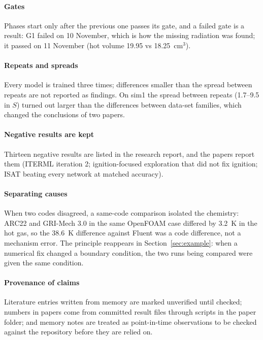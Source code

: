 \documentclass[preprint,review,12pt]{elsarticle}
\begin{document}
\paragraph{Gates} Phases start only after the previous one passes its gate, and a failed gate is a result: G1 failed on
10 November, which is how the missing radiation was found; it passed on 11 November (hot volume 19.95 vs 18.25~cm$^3$).

\paragraph{Repeats and spreads} Every model is trained three times; differences smaller than the spread between
repeats are not reported as findings. On sim1 the spread between repeats (1.7--9.5 in $S$) turned out larger than the
differences between data-set families, which changed the conclusions of two papers.

\paragraph{Negative results are kept} Thirteen negative results are listed in the research report, and the papers
report them (ITERML iteration 2; ignition-focused exploration that did not fix ignition; ISAT beating every network at
matched accuracy).

\paragraph{Separating causes} When two codes disagreed, a same-code comparison isolated the chemistry: ARC22 and
GRI-Mech 3.0 in the same OpenFOAM case differed by 3.2~K in the hot gas, so the 38.6~K difference against Fluent was a
code difference, not a mechanism error. The principle reappears in Section~\ref{sec:example}: when a numerical fix
changed a boundary condition, the two runs being compared were given the same condition.

\paragraph{Provenance of claims} Literature entries written from memory are marked unverified until checked; numbers
in papers come from committed result files through scripts in the paper folder; and memory notes are treated as
point-in-time observations to be checked against the repository before they are relied on.

\end{document}
